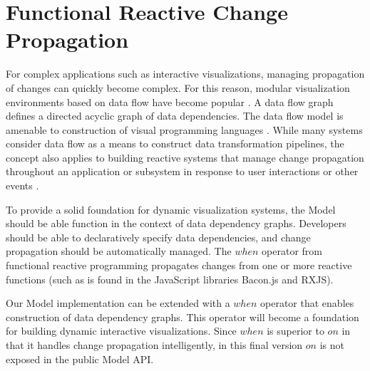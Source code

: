 \section{Functional Reactive Change Propagation}
For complex applications such as interactive visualizations, managing propagation of changes can quickly become complex. For this reason, modular visualization environments based on data flow have become popular \cite{abram1995extended}. A data flow graph defines a directed acyclic graph of data dependencies. The data flow model is amenable to construction of visual programming languages \cite{hils1992visual}. While many systems consider data flow as a means to construct data transformation pipelines, the concept also applies to building reactive systems that manage change propagation throughout an application or subsystem in response to user interactions or other events \cite{elliott1997functional}.

To provide a solid foundation for dynamic visualization systems, the Model should be able function in the context of data dependency graphs. Developers should be able to declaratively specify data dependencies, and change propagation should be automatically managed. The $when$ operator from functional reactive programming propagates changes from one or more reactive functions (such as is found in the JavaScript libraries Bacon.js and RXJS).

Our Model implementation can be extended with a $when$ operator that enables construction of data dependency graphs. This operator will become a foundation for building dynamic interactive visualizations. Since $when$ is superior to $on$ in that it handles change propagation intelligently, in this final version $on$ is not exposed in the public Model API.


